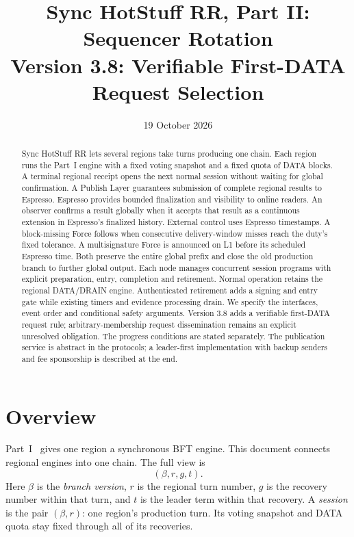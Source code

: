 \documentclass[11pt,a4paper]{article}
\title{Sync HotStuff RR, Part II: Sequencer Rotation\\\large Version 3.8: Verifiable First-DATA Request Selection}
\author{}\date{19 October 2026}
\newcommand{\defterm}[1]{\textcolor{rrBlue}{\textit{#1}}}
\newcounter{protocol}
\begin{document}
\maketitle
\begin{abstract}
Sync HotStuff RR lets several regions take turns producing one chain.
Each region runs the Part~I engine with a fixed voting snapshot and a
fixed quota of DATA blocks. A terminal regional receipt opens the next
normal session without waiting for global confirmation. A Publish Layer
guarantees submission of complete regional results to Espresso. Espresso
provides bounded finalization and visibility to online readers. An observer confirms a result
globally when it accepts that result as a continuous extension in
Espresso's finalized history. External control uses Espresso timestamps.
A block-missing Force follows when consecutive delivery-window misses
reach the duty's fixed tolerance. A multisignature Force is announced on L1 before its scheduled
Espresso time. Both preserve the entire global prefix and close the old
production branch to further global output. Each node manages concurrent session programs with explicit preparation,
entry, completion and retirement. Normal operation retains the regional
DATA/DRAIN engine. Authenticated retirement adds a signing and entry gate
while existing timers and evidence processing drain. We specify the
interfaces, event order and conditional safety arguments. Version 3.8 adds
a verifiable first-DATA request rule; arbitrary-membership request
dissemination remains an explicit unresolved obligation.
The progress conditions are stated separately. The publication service is
abstract in the protocols; a leader-first implementation with backup
senders and fee sponsorship is described at the end.
\end{abstract}

\section{Overview}
\label{sec:overview}
Part~I~\cite{part1} gives one region a synchronous BFT engine.
This document connects regional engines into one chain. The full view is
\[
 (\beta,r,g,t).
\]
Here $\beta$ is the \defterm{branch version}, $r$ is the regional turn
number, $g$ is the recovery number within that turn, and $t$ is the
leader term within that recovery. A \defterm{session} is the pair
$(\beta,r)$: one region's production turn. Its voting snapshot and DATA
quota stay fixed through all of its recoveries.
\end{document}
